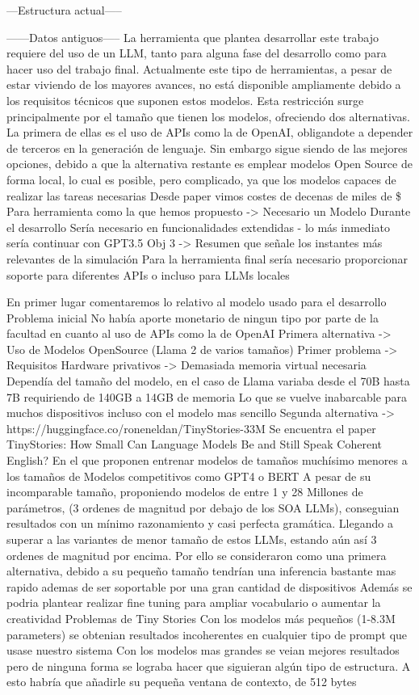 ---Estructura actual-----

------Datos antiguos-----
La herramienta que plantea desarrollar este trabajo requiere del uso de un LLM, tanto para alguna fase del desarrollo como para hacer uso del trabajo final. Actualmente este tipo de herramientas, a pesar de estar viviendo de los mayores avances, no está disponible ampliamente debido a los requisitos técnicos que suponen estos modelos. Esta restricción surge principalmente por el tamaño que tienen los modelos, ofreciendo dos alternativas. La primera de ellas es el uso de APIs como la de OpenAI, obligandote a depender de terceros en la generación de lenguaje. Sin embargo sigue siendo de las mejores opciones, debido a que la alternativa restante es emplear modelos Open Source de forma local, lo cual es posible, pero complicado, ya que los modelos capaces de realizar las tareas necesarias 
Desde paper vimos costes de decenas de miles de \$
Para herramienta como la que hemos propuesto -> Necesario un Modelo
Durante el desarrollo Sería necesario en funcionalidades extendidas - lo más inmediato sería continuar con GPT3.5
	Obj 3 -> Resumen que señale los instantes más relevantes de la simulación
Para la herramienta final sería necesario proporcionar soporte para diferentes APIs o incluso para LLMs locales

En primer lugar comentaremos lo relativo al modelo usado para el desarrollo
	Problema inicial
	No había aporte monetario de ningun tipo por parte de la facultad en cuanto al uso de APIs como la de OpenAI
	Primera alternativa -> Uso de Modelos OpenSource (Llama 2 de varios tamaños)
	Primer problema -> Requisitos Hardware privativos -> Demasiada memoria virtual necesaria
		Dependía del tamaño del modelo, en el caso de Llama variaba desde el 70B hasta 7B requiriendo de 140GB a 14GB de memoria 
		Lo que se vuelve inabarcable para muchos dispositivos incluso con el modelo mas sencillo
	Segunda alternativa -> https://huggingface.co/roneneldan/TinyStories-33M
		Se encuentra el paper TinyStories: How Small Can Language Models Be and Still Speak Coherent English?
		En el que proponen entrenar modelos de tamaños muchísimo menores a los tamaños de Modelos competitivos como GPT4 o BERT
		A pesar de su incomparable tamaño, proponiendo modelos de entre 1 y 28 Millones de parámetros, (3 ordenes de magnitud por debajo de los SOA LLMs), conseguian resultados con un mínimo razonamiento y casi perfecta gramática. Llegando a superar a las variantes de menor tamaño de estos LLMs, estando aún así 3 ordenes de magnitud por encima.
		Por ello se consideraron como una primera alternativa, debido a su pequeño tamaño tendrían una inferencia bastante mas rapido ademas de ser soportable por una gran cantidad de dispositivos
		Además se podria plantear realizar fine tuning para ampliar vocabulario o aumentar la creatividad
	Problemas de Tiny Stories
		Con los modelos más pequeños (1-8.3M parameters) se obtenian resultados incoherentes en cualquier tipo de prompt que usase nuestro sistema
		Con los modelos mas grandes se veian mejores resultados pero de ninguna forma se lograba hacer que siguieran algún tipo de estructura.
		A esto habría que añadirle su pequeña ventana de contexto, de 512 bytes
	

